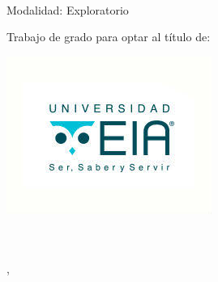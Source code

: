 

\thispagestyle{empty}


	\begin{center}
		\Large 
		\tfgtitlename \\
		\bigskip
		Modalidad: Exploratorio
	\end{center}

	\bigskip
	\bigskip 
	\bigskip 

	\begin{center}
		\Large 
		\tfgauthorname
	\end{center}

	\bigskip \bigskip \bigskip  

	\vfill
	
	\begin{center}
		\Large
		Trabajo de grado para optar al título de:\\
		\tfgGrado
	\end{center}
 \bigskip   \bigskip   \bigskip  \bigskip  
 \vfill
	\begin{center}
		\Large 
		\tfgtutorname
	\end{center}

\begin{center}
	\includegraphics{Figuras/Logo_EIA}
\end{center}

	\begin{center}
		\large 
		\tfgUniversidad \\%
		\tfgCarrera\\
		
		\tfgCiudad, \tfganno %
	\end{center}

\blankpage